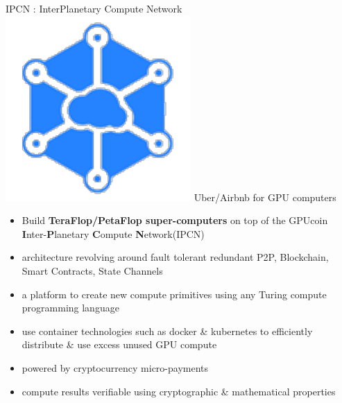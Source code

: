 \begin{frame}[t]{IPCN
	: InterPlanetary Compute Network}
	\includegraphics[scale=.3]{static/ipcn-p2p}
	 Uber/Airbnb for GPU computers
 \begin{itemize}[<+-| alert@+>]
 \item Build \textbf{TeraFlop/PetaFlop super-computers} on top of the GPUcoin \textbf{I}nter-\textbf{P}lanetary \textbf{C}ompute \textbf{N}etwork(IPCN)
 \item architecture revolving around fault tolerant redundant P2P, Blockchain, Smart Contracts, State Channels
 \item a platform to create new compute primitives using any Turing compute programming language
 \item use container technologies such as docker \& kubernetes to efficiently distribute \& use excess unused GPU compute
 \item powered by cryptocurrency micro-payments
 \item compute results verifiable using cryptographic \& mathematical properties
 \end{itemize}
\end{frame}